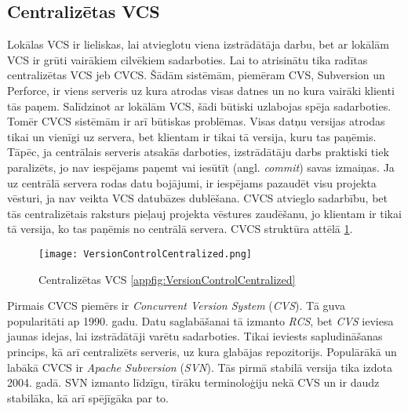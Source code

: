 \subsection{Centralizētas VCS}
Lokālas VCS ir lieliskas, lai atvieglotu viena izstrādātāja darbu, bet ar lokālām VCS ir grūti vairākiem cilvēkiem sadarboties. Lai to atrisinātu tika radītas centralizētas VCS jeb CVCS. Šādām sistēmām, piemēram CVS, Subversion un Perforce, ir viens serveris uz kura atrodas visas datnes un no kura vairāki klienti tās paņem. Salīdzinot ar lokālām VCS, šādi būtiski uzlabojas spēja sadarboties. Tomēr CVCS sistēmām ir arī būtiskas problēmas. Visas datņu versijas atrodas tikai un vienīgi uz servera, bet klientam ir tikai tā versija, kuru tas paņēmis. Tāpēc, ja centrālais serveris atsakās darboties, izstrādātāju darbs praktiski tiek paralizēts, jo nav iespējams paņemt vai iesūtīt (angl. \textit{commit}) savas izmaiņas. Ja uz centrālā servera rodas datu bojājumi, ir iespējams pazaudēt visu projekta vēsturi, ja nav veikta VCS datubāzes dublēšana.
CVCS atvieglo sadarbību, bet tās centralizētais raksturs pieļauj projekta vēstures zaudēšanu, jo klientam ir tikai tā versija, ko tas paņēmis no centrālā servera. CVCS struktūra attēlā \ref{fig:VersionControlCentralized}.
\begin{figure}[H]%
	\centering
	\captionsetup{justification=centering}
	\texttt{[image: VersionControlCentralized.png]}
	\caption{Centralizētas VCS \ref{appfig:VersionControlCentralized}}
	\label{fig:VersionControlCentralized}
\end{figure}
Pirmais CVCS piemērs ir \textit{Concurrent Version System} (\textit{CVS}). Tā guva popularitāti ap 1990. gadu. Datu saglabāšanai tā izmanto \textit{RCS}, bet \textit{CVS} ieviesa jaunas idejas, lai izstrādātāji varētu sadarboties. Tikai ieviests sapludināšanas princips, kā arī centralizēts serveris, uz kura glabājas repozitorijs.
Populārākā un labākā CVCS ir \textit{Apache Subversion} (\textit{SVN}). Tās pirmā stabilā versija tika izdota 2004. gadā. SVN izmanto līdzīgu, tīrāku terminoloģiju nekā CVS un ir daudz stabilāka, kā arī spējīgāka par to.

